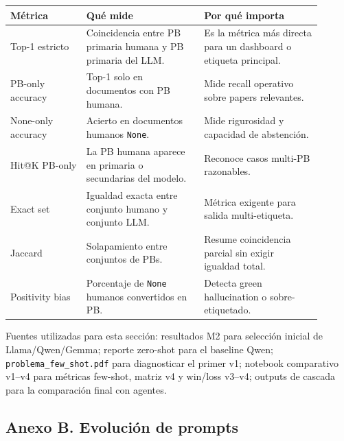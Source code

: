 \begin{center}
\scriptsize
\setlength{\tabcolsep}{4pt}
\renewcommand{\arraystretch}{1.15}
\begin{tabular}{p{0.22\linewidth}p{0.34\linewidth}p{0.34\linewidth}}
\toprule
Métrica & Qué mide & Por qué importa \\
\midrule
Top-1 estricto & Coincidencia entre PB primaria humana y PB primaria del LLM. & Es la métrica más directa para un dashboard o etiqueta principal. \\
PB-only accuracy & Top-1 solo en documentos con PB humana. & Mide recall operativo sobre papers relevantes. \\
None-only accuracy & Acierto en documentos humanos \texttt{None}. & Mide rigurosidad y capacidad de abstención. \\
Hit@K PB-only & La PB humana aparece en primaria o secundarias del modelo. & Reconoce casos multi-PB razonables. \\
Exact set & Igualdad exacta entre conjunto humano y conjunto LLM. & Métrica exigente para salida multi-etiqueta. \\
Jaccard & Solapamiento entre conjuntos de PBs. & Resume coincidencia parcial sin exigir igualdad total. \\
Positivity bias & Porcentaje de \texttt{None} humanos convertidos en PB. & Detecta green hallucination o sobre-etiquetado. \\
\bottomrule
\end{tabular}
\end{center}

Fuentes utilizadas para esta sección: resultados M2 para selección inicial de Llama/Qwen/Gemma; reporte zero-shot para el baseline Qwen; \texttt{problema\_few\_shot.pdf} para diagnosticar el primer v1; notebook comparativo v1--v4 para métricas few-shot, matriz v4 y win/loss v3--v4; outputs de cascada para la comparación final con agentes.

\subsection*{Anexo B. Evolución de prompts}

